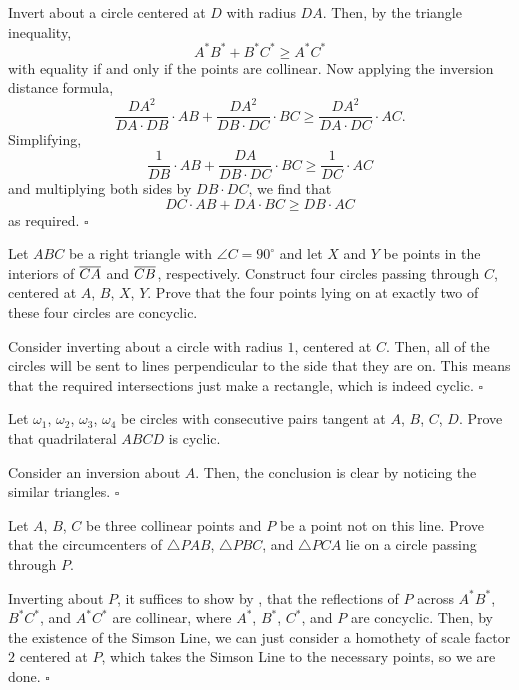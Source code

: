 \documentclass{article}
\begin{document}
Invert about a circle centered at $D$ with radius $DA$. Then, by the triangle inequality, \[A^*B^*+B^*C^*\ge A^*C^*\] with equality if and only if the points are collinear. Now applying the inversion distance formula, \[\dfrac{DA^2}{DA\cdot DB}\cdot AB + \dfrac{DA^2}{DB\cdot DC}\cdot BC \ge \dfrac{DA^2}{DA\cdot DC}\cdot AC.\] Simplifying, \[\dfrac{1}{DB}\cdot AB + \dfrac{DA}{DB\cdot DC}\cdot BC \ge \dfrac{1}{DC}\cdot AC\] and multiplying both sides by $DB\cdot DC$, we find that \[DC\cdot AB + DA\cdot BC \ge DB\cdot AC\] as required. $\square$

\begin{problem}[8.23]{}
Let $ABC$ be a right triangle with $\angle C = 90^\circ$ and let $X$ and $Y$ be points in the interiors of $\overline{CA}$ and $\overline{CB}$, respectively. Construct four circles passing through $C$, centered at $A$, $B$, $X$, $Y$. Prove that the four points lying on at exactly two of these four circles are concyclic.
\end{problem}

Consider inverting about a circle with radius $1$, centered at $C$. Then, all of the circles will be sent to lines perpendicular to the side that they are on. This means that the required intersections just make a rectangle, which is indeed cyclic. $\square$

\begin{problem}[8.24]{}
Let $\omega_1$, $\omega_2$, $\omega_3$, $\omega_4$ be circles with consecutive pairs tangent at $A$, $B$, $C$, $D$. Prove that quadrilateral $ABCD$ is cyclic.
\end{problem}

Consider an inversion about $A$. Then, the conclusion is clear by noticing the similar triangles. $\square$

\begin{problem}[8.25]{}
Let $A$, $B$, $C$ be three collinear points and $P$ be a point not on this line. Prove that the circumcenters of $\triangle PAB$, $\triangle PBC$, and $\triangle PCA$ lie on a circle passing through $P$.
\end{problem}

Inverting about $P$, it suffices to show by , that the reflections of $P$ across $A^*B^*$, $B^*C^*$, and $A^*C^*$ are collinear, where $A^*$, $B^*$, $C^*$, and $P$ are concyclic. Then, by the existence of the Simson Line, we can just consider a homothety of scale factor $2$ centered at $P$, which takes the Simson Line to the necessary points, so we are done. $\square$
\end{document}
